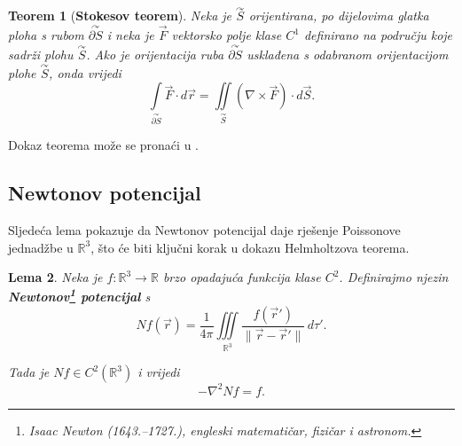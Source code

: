 \documentclass[12pt,a4paper]{article}
\makeatletter
\newtheorem{tm}{Teorem}[section]
\newtheorem{lema}[tm]{Lema}
\renewenvironment{proof}[1][\proofname]{\par
  \pushQED{\qed}%
  \normalfont
  \topsep6\p@\@plus6\p@\relax
  \trivlist
  \item[\hskip\labelsep
  \bfseries #1\@addpunct{.}]\ignorespaces
}{%
  \popQED\endtrivlist\@endpefalse
}
\makeatother
\begin{document}
\begin{tm}[\textbf{Stokesov teorem}]
Neka je $\overset{\curvearrowright}{S}$ orijentirana, po dijelovima glatka ploha s rubom
$\overset{\curvearrowright}{\partial S}$ i neka je $\overrightarrow{F}$ vektorsko polje klase $C^1$
definirano na području koje sadrži plohu $\overset{\curvearrowright}{S}$. Ako je orijentacija
ruba $\overset{\curvearrowright}{\partial S}$ usklađena s odabranom orijentacijom plohe $\overset{\curvearrowright}{S}$,
onda vrijedi
$$
\int\limits_{\overset{\curvearrowright}{\partial S}}
\overrightarrow{F}\cdot d\overrightarrow{r}
=
\iint\limits_{\overset{\curvearrowright}{S}}
(\nabla\times\overrightarrow{F})\cdot d\overrightarrow{S}.
$$
\end{tm}
\begin{proof}
Dokaz teorema može se pronaći u \cite{uglesic}.
\end{proof}


\subsection{Newtonov potencijal}

Sljedeća lema pokazuje da Newtonov potencijal daje rješenje Poissonove
jednadžbe u \(\mathbb{R}^3\), što će biti ključni korak u dokazu
Helmholtzova teorema.

\begin{lema}
Neka je \(f:\mathbb{R}^3\to\mathbb{R}\) brzo opadajuća funkcija klase
\(C^2\). Definirajmo njezin \textbf{Newtonov\footnote{Isaac Newton (1643.--1727.), engleski matematičar, fizičar i astronom.} potencijal} s
$$
Nf(\overrightarrow{r})
=
\frac{1}{4\pi}
\iiint\limits_{\mathbb{R}^3}
\frac{f(\overrightarrow{r}')}
{\|\overrightarrow{r}-\overrightarrow{r}'\|}\,d\tau'.
$$

Tada je \(Nf\in C^2(\mathbb{R}^3)\) i vrijedi
$$
-\nabla^2Nf=f.
$$
\end{lema}
\end{document}
